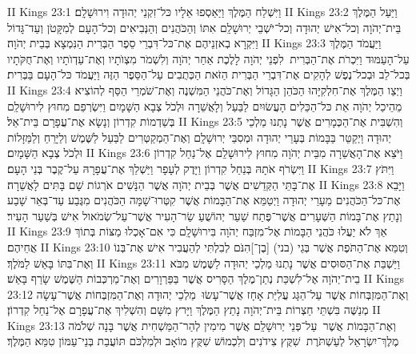 II Kings 23:1	וַיִּשְׁלַח הַמֶּלֶךְ וַיַּאַסְפוּ אֵלָיו כּל־זִקְנֵי יְהוּדָה וִירוּשָׁלָ͏ִם׃
II Kings 23:2	וַיַּעַל הַמֶּלֶךְ בֵּית־יְהֹוָה וְכל־אִישׁ יְהוּדָה וְכל־יֹשְׁבֵי יְרוּשָׁלַ͏ִם אִתּוֹ וְהַכֹּהֲנִים וְהַנְּבִיאִים וְכל־הָעָם לְמִקָּטֹן וְעַד־גָּדוֹל וַיִּקְרָא בְאזְנֵיהֶם אֶת־כּל־דִּבְרֵי סֵפֶר הַבְּרִית הַנִּמְצָא בְּבֵית יְהֹוָה׃
II Kings 23:3	וַיַּעֲמֹד הַמֶּלֶךְ עַל־הָעַמּוּד וַיִּכְרֹת אֶת־הַבְּרִית  לִפְנֵי יְהֹוָה לָלֶכֶת אַחַר יְהֹוָה וְלִשְׁמֹר מִצְוֺתָיו וְאֶת־עֵדְוֺתָיו וְאֶת־חֻקֹּתָיו בְּכל־לֵב וּבְכל־נֶפֶשׁ לְהָקִים אֶת־דִּבְרֵי הַבְּרִית הַזֹּאת הַכְּתֻבִים עַל־הַסֵּפֶר הַזֶּה וַיַּעֲמֹד כּל־הָעָם בַּבְּרִית׃
II Kings 23:4	וַיְצַו הַמֶּלֶךְ אֶת־חִלְקִיָּהוּ הַכֹּהֵן הַגָּדוֹל וְאֶת־כֹּהֲנֵי הַמִּשְׁנֶה וְאֶת־שֹׁמְרֵי הַסַּף לְהוֹצִיא מֵהֵיכַל יְהֹוָה אֵת כּל־הַכֵּלִים הָעֲשׂוּיִם לַבַּעַל וְלָאֲשֵׁרָה וּלְכֹל צְבָא הַשָּׁמָיִם וַיִּשְׂרְפֵם מִחוּץ לִירוּשָׁלַ͏ִם בְּשַׁדְמוֹת קִדְרוֹן וְנָשָׂא אֶת־עֲפָרָם בֵּית־אֵל׃
II Kings 23:5	וְהִשְׁבִּית אֶת־הַכְּמָרִים אֲשֶׁר נָתְנוּ מַלְכֵי יְהוּדָה וַיְקַטֵּר בַּבָּמוֹת בְּעָרֵי יְהוּדָה וּמְסִבֵּי יְרוּשָׁלָ͏ִם וְאֶת־הַמְקַטְּרִים לַבַּעַל לַשֶּׁמֶשׁ וְלַיָּרֵחַ וְלַמַּזָּלוֹת וּלְכֹל צְבָא הַשָּׁמָיִם׃
II Kings 23:6	וַיֹּצֵא אֶת־הָאֲשֵׁרָה מִבֵּית יְהֹוָה מִחוּץ לִירוּשָׁלַ͏ִם אֶל־נַחַל קִדְרוֹן וַיִּשְׂרֹף אֹתָהּ בְּנַחַל קִדְרוֹן וַיָּדֶק לְעָפָר וַיַּשְׁלֵךְ אֶת־עֲפָרָהּ עַל־קֶבֶר בְּנֵי הָעָם׃
II Kings 23:7	וַיִּתֹּץ אֶת־בָּתֵּי הַקְּדֵשִׁים אֲשֶׁר בְּבֵית יְהֹוָה אֲשֶׁר הַנָּשִׁים אֹרְגוֹת שָׁם בָּתִּים לָאֲשֵׁרָה׃
II Kings 23:8	וַיָּבֵא אֶת־כּל־הַכֹּהֲנִים מֵעָרֵי יְהוּדָה וַיְטַמֵּא אֶת־הַבָּמוֹת אֲשֶׁר קִטְּרוּ־שָׁמָּה הַכֹּהֲנִים מִגֶּבַע עַד־בְּאֵר שָׁבַע וְנָתַץ אֶת־בָּמוֹת הַשְּׁעָרִים אֲשֶׁר־פֶּתַח שַׁעַר יְהוֹשֻׁעַ שַׂר־הָעִיר אֲשֶׁר־עַל־שְׂמֹאול אִישׁ בְּשַׁעַר הָעִיר׃
II Kings 23:9	אַךְ לֹא יַעֲלוּ כֹּהֲנֵי הַבָּמוֹת אֶל־מִזְבַּח יְהֹוָה בִּירוּשָׁלָ͏ִם כִּי אִם־אָכְלוּ מַצּוֹת בְּתוֹךְ אֲחֵיהֶם׃
II Kings 23:10	וְטִמֵּא אֶת־הַתֹּפֶת אֲשֶׁר בְּגֵי (בני) [בֶן־]הִנֹּם לְבִלְתִּי לְהַעֲבִיר אִישׁ אֶת־בְּנוֹ וְאֶת־בִּתּוֹ בָּאֵשׁ לַמֹּלֶךְ׃
II Kings 23:11	וַיַּשְׁבֵּת אֶת־הַסּוּסִים אֲשֶׁר נָתְנוּ מַלְכֵי יְהוּדָה לַשֶּׁמֶשׁ מִבֹּא בֵית־יְהֹוָה אֶל־לִשְׁכַּת נְתַן־מֶלֶךְ הַסָּרִיס אֲשֶׁר בַּפַּרְוָרִים וְאֶת־מַרְכְּבוֹת הַשֶּׁמֶשׁ שָׂרַף בָּאֵשׁ׃
II Kings 23:12	וְאֶת־הַמִּזְבְּחוֹת אֲשֶׁר עַל־הַגָּג עֲלִיַּת אָחָז אֲשֶׁר־עָשׂוּ  מַלְכֵי יְהוּדָה וְאֶת־הַמִּזְבְּחוֹת אֲשֶׁר־עָשָׂה מְנַשֶּׁה בִּשְׁתֵּי חַצְרוֹת בֵּית־יְהֹוָה נָתַץ הַמֶּלֶךְ וַיָּרץ מִשָּׁם וְהִשְׁלִיךְ אֶת־עֲפָרָם אֶל־נַחַל קִדְרוֹן׃
II Kings 23:13	וְאֶת־הַבָּמוֹת אֲשֶׁר  עַל־פְּנֵי יְרוּשָׁלַ͏ִם אֲשֶׁר מִימִין לְהַר־הַמַּשְׁחִית אֲשֶׁר בָּנָה שְׁלֹמֹה מֶלֶךְ־יִשְׂרָאֵל לְעַשְׁתֹּרֶת  שִׁקֻּץ צִידֹנִים וְלִכְמוֹשׁ שִׁקֻּץ מוֹאָב וּלְמִלְכֹּם תּוֹעֲבַת בְּנֵי־עַמּוֹן טִמֵּא הַמֶּלֶךְ׃
